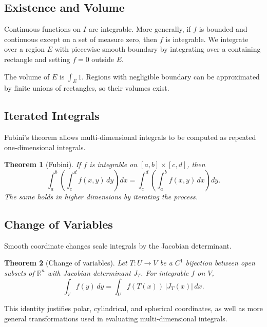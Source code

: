 \documentclass{article}
\theoremstyle{definition}
\theoremstyle{plain}
\newtheorem{theorem}{Theorem}[section]
\begin{document}
\subsection{Existence and Volume}
Continuous functions on $I$ are integrable. More generally, if $f$ is bounded and continuous except on a set of measure zero, then $f$ is integrable. We integrate over a region $E$ with piecewise smooth boundary by integrating over a containing rectangle and setting $f=0$ outside $E$.

The volume of $E$ is $\int_E 1$. Regions with negligible boundary can be approximated by finite unions of rectangles, so their volumes exist.

\subsection{Iterated Integrals}
Fubini’s theorem allows multi-dimensional integrals to be computed as repeated one-dimensional integrals.
\begin{theorem}[Fubini]\label{thm:fubini}
	If $f$ is integrable on $[a,b]\times[c,d]$, then
	\[
		\int_a^b \left(\int_c^d f(x,y)\,dy \right) dx = \int_c^d \left(\int_a^b f(x,y)\,dx \right) dy.
	\]
	The same holds in higher dimensions by iterating the process.
\end{theorem}

\subsection{Change of Variables}
Smooth coordinate changes scale integrals by the Jacobian determinant.
\begin{theorem}[Change of variables]
	Let $T\colon U\to V$ be a $C^1$ bijection between open subsets of $\mathbb{R}^n$ with Jacobian determinant $J_T$. For integrable $f$ on $V$,
	\[
		\int_V f(y)\,dy = \int_U f(T(x))\,|J_T(x)|\,dx.
	\]
\end{theorem}

This identity justifies polar, cylindrical, and spherical coordinates, as well as more general transformations used in evaluating multi-dimensional integrals.


		
\end{document}

